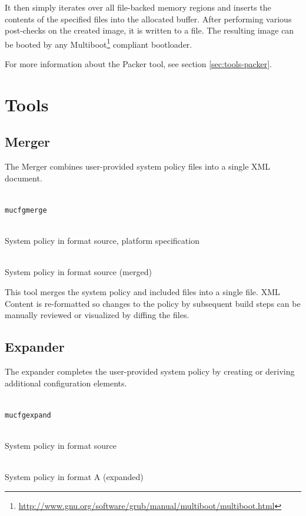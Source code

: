 \documentclass[a4paper,twoside,titlepage]{article}
\begin{document}
It then simply iterates over all file-backed memory regions and inserts the
contents of the specified files into the allocated buffer. After performing
various post-checks on the created image, it is written to a file. The
resulting image can be booted by any
Multiboot\footnote{\url{http://www.gnu.org/software/grub/manual/multiboot/multiboot.html}}
compliant bootloader.

For more information about the Packer tool, see section \ref{sec:tools-packer}.

\section{Tools}
\label{sec:tools}

\subsection{Merger}
\label{sec:tools-merger}
The Merger combines user-provided system policy files into a single XML
document.

\begin{description} \itemsep1pt \parskip0pt
	\item[Name] \hfill \\
		\texttt{mucfgmerge}
	\item[Input] \hfill \\
		System policy in format source, platform specification
	\item[Output] \hfill \\
		System policy in format source (merged)
\end{description}

This tool merges the system policy and included files into a single file. XML
Content is re-formatted so changes to the policy by subsequent build steps can
be manually reviewed or visualized by diffing the files.

\subsection{Expander}
\label{sec:tools-expander}
The expander completes the user-provided system policy by creating or deriving
additional configuration elements.

\begin{description} \itemsep1pt \parskip0pt
	\item[Name] \hfill \\
		\texttt{mucfgexpand}
	\item[Input] \hfill \\
		System policy in format source
	\item[Output] \hfill \\
		System policy in format A (expanded)
\end{description}
\end{document}
